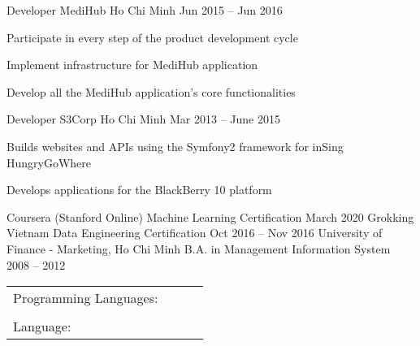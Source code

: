 \documentclass[]{awesome-cv}
\begin{document}
\begin{cventries}
{\begin{cvitems}
		\end{cvitems}}
	\cventry
	{Developer}
	{MediHub}
	{Ho Chi Minh}
	{Jun 2015 – Jun 2016}
	{\begin{cvitems}
		\item {Participate in every step of the product development cycle}
		\item {Implement infrastructure for MediHub application}
		\item {Develop all the MediHub application's core functionalities}
		\end{cvitems}}
	\cventry
	{Developer}
	{S3Corp}
	{Ho Chi Minh}
	{Mar 2013 – June 2015}
	{
		\begin{cvitems}
			\item {Builds websites and APIs using the Symfony2 framework for inSing HungryGoWhere}
			\item {Develops applications for the BlackBerry 10 platform}
		\end{cvitems}
	}
\end{cventries}
\begin{cventries}
	\cventry
	{Coursera (Stanford Online)}
	{Machine Learning Certification}
	{}
	{March 2020}
	{}
	\cventry
	{Grokking Vietnam}
	{Data Engineering Certification}
	{}
	{Oct 2016 – Nov 2016}
	{}
	\cventry
	{University of Finance - Marketing, Ho Chi Minh}
	{B.A. in Management Information System}
	{}
	{2008 – 2012}
	{}
\end{cventries}
\vspace{-2mm}
\begin{cventries}
	\cventry
	{}
	{\def\arraystretch{1.15}{\begin{tabular}{ l l l l }
		Programming Languages:  & {} & {} & {} \\
		{} & {\skill{ PHP \faStar }} & {\skill{ Golang }} & {\skill{ as }} \\
		Language:  & {\skill{ English }} & {\skill{ Vietnamese }} & {\skill{ as }} \\
		\end{tabular}}}
	{}
	{}
	{}
\end{cventries}
\end{document}
